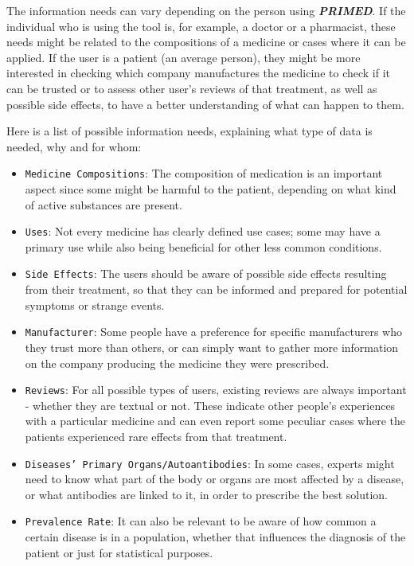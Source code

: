 \documentclass[sigconf]{acmart}
\begin{document}
The information needs can vary depending on the person using \textit{\textbf{PRIMED}}. If the individual who is using the tool is, for example, a doctor or a pharmacist, these needs might be related to the compositions of a medicine or cases where it can be applied. If the user is a patient (an average person), they might be more interested in checking which company manufactures the medicine to check if it can be trusted or to assess other user's reviews of that treatment, as well as possible side effects, to have a better understanding of what can happen to them.

Here is a list of possible information needs, explaining what type of data is needed, why and for whom:
\begin{itemize}
	\item {\texttt{Medicine Compositions}}: The composition of medication is an important aspect since some might be harmful to the patient, depending on what kind of active substances are present.
	\item {\texttt{Uses}}: Not every medicine has clearly defined use cases; some may have a primary use while also being beneficial for other less common conditions.
	\item {\texttt{Side Effects}}: The users should be aware of possible side effects resulting from their treatment, so that they can be informed and prepared for potential symptoms or strange events.
	\item {\texttt{Manufacturer}}: Some people have a preference for specific manufacturers who they trust more than others, or can simply want to gather more information on the company producing the medicine they were prescribed.
	\item {\texttt{Reviews}}: For all possible types of users, existing reviews are always important - whether they are textual or not. These indicate other people's experiences with a particular medicine and can even report some peculiar cases where the patients experienced rare effects from that treatment.
	\item {\texttt{Diseases' Primary Organs/Autoantibodies}}: In some cases, experts might need to know what part of the body or organs are most affected by a disease, or what antibodies are linked to it, in order to prescribe the best solution.
	\item {\texttt{Prevalence Rate}}: It can also be relevant to be aware of how common a certain disease is in a population, whether that influences the diagnosis of the patient or just for statistical purposes.
\end{itemize}
\end{document}
